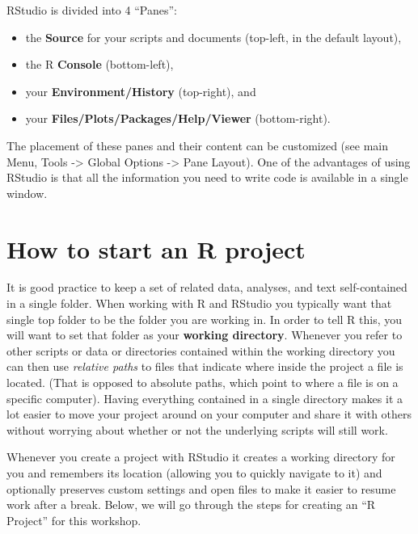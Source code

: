 \documentclass[]{book}
\providecommand{\tightlist}{%
  \setlength{\itemsep}{0pt}\setlength{\parskip}{0pt}}
\theoremstyle{definition}
\theoremstyle{definition}
\theoremstyle{remark}
\begin{document}
RStudio is divided into 4 ``Panes'':

\begin{itemize}
\tightlist
\item
  the \textbf{Source} for your scripts and documents (top-left, in the
  default layout),
\item
  the R \textbf{Console} (bottom-left),
\item
  your \textbf{Environment/History} (top-right), and
\item
  your \textbf{Files/Plots/Packages/Help/Viewer} (bottom-right).
\end{itemize}

The placement of these panes and their content can be customized (see
main Menu, Tools -\textgreater{} Global Options -\textgreater{} Pane
Layout). One of the advantages of using RStudio is that all the
information you need to write code is available in a single window.

\section{How to start an R project}\label{how-to-start-an-r-project}

It is good practice to keep a set of related data, analyses, and text
self-contained in a single folder. When working with R and RStudio you
typically want that single top folder to be the folder you are working
in. In order to tell R this, you will want to set that folder as your
\textbf{working directory}. Whenever you refer to other scripts or data
or directories contained within the working directory you can then use
\emph{relative paths} to files that indicate where inside the project a
file is located. (That is opposed to absolute paths, which point to
where a file is on a specific computer). Having everything contained in
a single directory makes it a lot easier to move your project around on
your computer and share it with others without worrying about whether or
not the underlying scripts will still work.

Whenever you create a project with RStudio it creates a working
directory for you and remembers its location (allowing you to quickly
navigate to it) and optionally preserves custom settings and open files
to make it easier to resume work after a break. Below, we will go
through the steps for creating an ``R Project'' for this workshop.
\end{document}

